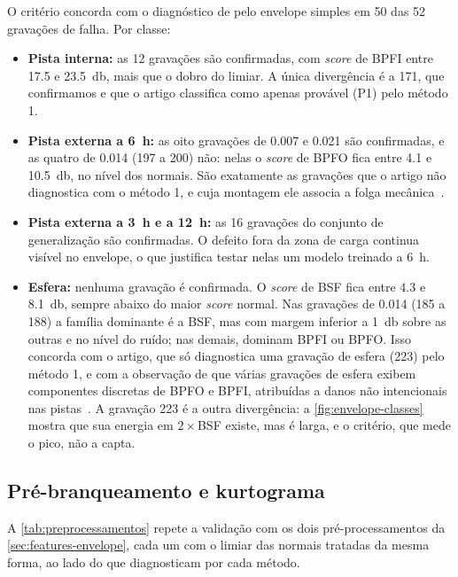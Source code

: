 O critério concorda com o diagnóstico de \textcite{smith2015} pelo envelope
simples em 50 das 52 gravações de falha. Por classe:
\begin{itemize}
  \item \textbf{Pista interna:} as 12 gravações são confirmadas, com \emph{score} de
  BPFI entre \num{17.5} e \SI{23.5}{\decibel}, mais que o dobro do limiar.
  A única divergência é a 171, que confirmamos e que o artigo classifica como
  apenas provável (P1) pelo método 1.
  \item \textbf{Pista externa a 6~h:} as oito gravações de \SI{0.007}{\inch} e
  \SI{0.021}{\inch} são confirmadas, e as quatro de \SI{0.014}{\inch} (197 a 200)
  não: nelas o \emph{score} de BPFO fica entre \num{4.1} e \SI{10.5}{\decibel}, no
  nível dos normais. São exatamente as gravações que o artigo não diagnostica com
  o método 1, e cuja montagem ele associa a folga mecânica~\cite[p.~110]{smith2015}.
  \item \textbf{Pista externa a 3~h e a 12~h:} as 16 gravações do conjunto de
  generalização são confirmadas. O defeito fora da zona de carga continua
  visível no envelope, o que justifica testar nelas um modelo treinado a 6~h.
  \item \textbf{Esfera:} nenhuma gravação é confirmada. O \emph{score} de BSF fica
  entre \num{4.3} e \SI{8.1}{\decibel}, sempre abaixo do maior \emph{score} normal.
  Nas gravações de \SI{0.014}{\inch} (185 a 188) a família dominante é a BSF, mas
  com margem inferior a \SI{1}{\decibel} sobre as outras e no nível do ruído; nas
  demais, dominam BPFI ou BPFO. Isso concorda com o artigo, que só diagnostica uma
  gravação de esfera (223) pelo método 1, e com a observação de que várias
  gravações de esfera exibem componentes discretas de BPFO e BPFI, atribuídas a
  danos não intencionais nas pistas~\cite[p.~109--110]{smith2015}. A gravação
  223 é a outra divergência: a \autoref{fig:envelope-classes} mostra que sua
  energia em $2 \times$BSF existe, mas é larga, e o critério, que mede o pico,
  não a capta.
\end{itemize}

\subsection{Pré-branqueamento e kurtograma}
\label{sec:res-preprocessamentos}

A
\autoref{tab:preprocessamentos} repete a validação com os dois pré-processamentos
da \autoref{sec:features-envelope}, cada um com o limiar das normais tratadas da
mesma forma, ao lado do que \textcite[Tab.~B2]{smith2015} diagnosticam por cada
método.

